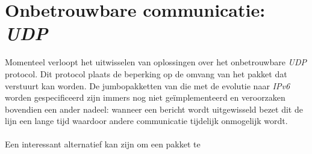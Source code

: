 \section{Onbetrouwbare communicatie: \emph{UDP}}

Momenteel verloopt het uitwisselen van oplossingen over het onbetrouwbare \emph{UDP} protocol. Dit protocol plaats de beperking op de omvang van het pakket dat verstuurt kan worden. De jumbopakketten van die met de evolutie naar \emph{IPv6} worden gespecificeerd zijn immers nog niet ge\"implementeerd en veroorzaken bovendien een ander nadeel: wanneer een bericht wordt uitgewisseld bezet dit de lijn een lange tijd waardoor andere communicatie tijdelijk onmogelijk wordt.

\paragraph{}
Een interessant alternatief kan zijn om een pakket te 